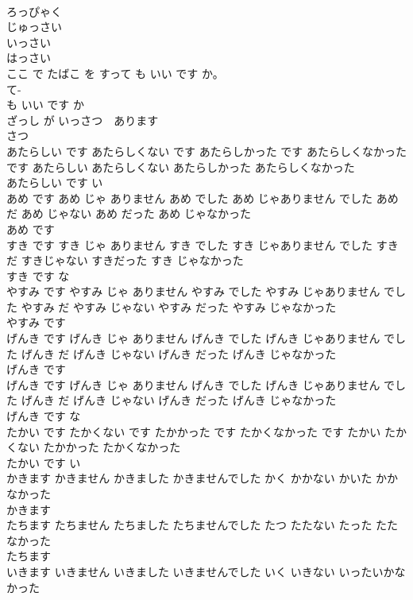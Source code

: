 \documentclass[8pt]{extreport}
\begin{document}
\begin{CJK}{UTF8}{min}
\\	ろっぴゃく
\\	じゅっさい
\\	いっさい
\\	はっさい
\\	ここ で たばこ を すって も いい です か。	
\\	て-
\\	も いい です か 
\\	ざっし が いっさつ　あります	
\\	さつ
\\	あたらしい です あたらしくない です あたらしかった です あたらしくなかった です	あたらしい あたらしくない あたらしかった あたらしくなかった	
\\	あたらしい です	い 
\\	あめ です あめ じゃ ありません あめ でした あめ じゃありません でした	あめ だ あめ じゃない あめ だった あめ じゃなかった	
\\	あめ です	
\\	すき です すき じゃ ありません すき でした すき じゃありません でした	すきだ すきじゃない すきだった すき じゃなかった	
\\	すき です	な 
\\	やすみ です やすみ じゃ ありません やすみ でした やすみ じゃありません でした	やすみ だ やすみ じゃない やすみ だった やすみ じゃなかった	
\\	やすみ です	
\\	げんき です げんき じゃ ありません げんき でした げんき じゃありません でした	げんき だ げんき じゃない げんき だった げんき じゃなかった	
\\	げんき です	
\\	げんき です げんき じゃ ありません げんき でした げんき じゃありません でした	げんき だ げんき じゃない げんき だった げんき じゃなかった	
\\	げんき です	な 
\\	たかい です たかくない です たかかった です たかくなかった です	たかい たかくない たかかった たかくなかった	
\\	たかい です	い 
\\	かきます かきません かきました かきませんでした	かく かかない かいた かかなかった	
\\	かきます	
\\	たちます たちません たちました たちませんでした	たつ たたない たった たたなかった	
\\	たちます	
\\	いきます いきません いきました いきませんでした	いく いきない いったいかなかった	

\end{CJK}
\end{document}
